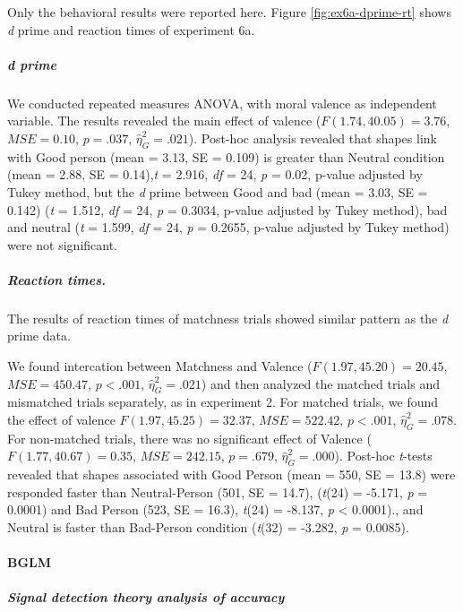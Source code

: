 \documentclass[
  english,
  man]{apa6}
\let\oldparagraph\paragraph
\renewcommand{\paragraph}[1]{\oldparagraph{#1}\mbox{}}
\let\oldsubparagraph\subparagraph
\renewcommand{\subparagraph}[1]{\oldsubparagraph{#1}\mbox{}}
\begin{document}
Only the behavioral results were reported here. Figure \ref{fig:ex6a-dprime-rt} shows \emph{d} prime and reaction times of experiment 6a.

\hypertarget{d-prime-3}{%
\subparagraph{d prime}\label{d-prime-3}}

We conducted repeated measures ANOVA, with moral valence as independent variable. The results revealed the main effect of valence (\(F(1.74, 40.05) = 3.76\), \(\mathit{MSE} = 0.10\), \(p = .037\), \(\hat{\eta}^2_G = .021\)). Post-hoc analysis revealed that shapes link with Good person (mean = 3.13, SE = 0.109) is greater than Neutral condition (mean = 2.88, SE = 0.14),\emph{t} = 2.916, \emph{df} = 24, \emph{p} = 0.02, p-value adjusted by Tukey method, but the \emph{d} prime between Good and bad (mean = 3.03, SE = 0.142) (\emph{t} = 1.512, \emph{df} = 24, \emph{p} = 0.3034, p-value adjusted by Tukey method), bad and neutral (\emph{t} = 1.599, \emph{df} = 24, \emph{p} = 0.2655, p-value adjusted by Tukey method) were not significant.

\hypertarget{reaction-times.}{%
\subparagraph{Reaction times.}\label{reaction-times.}}

The results of reaction times of matchness trials showed similar pattern as the \emph{d} prime data.

We found intercation between Matchness and Valence (\(F(1.97, 45.20) = 20.45\), \(\mathit{MSE} = 450.47\), \(p < .001\), \(\hat{\eta}^2_G = .021\)) and then analyzed the matched trials and mismatched trials separately, as in experiment 2. For matched trials, we found the effect of valence \(F(1.97, 45.25) = 32.37\), \(\mathit{MSE} = 522.42\), \(p < .001\), \(\hat{\eta}^2_G = .078\). For non-matched trials, there was no significant effect of Valence (\(F(1.77, 40.67) = 0.35\), \(\mathit{MSE} = 242.15\), \(p = .679\), \(\hat{\eta}^2_G = .000\)). Post-hoc \emph{t}-tests revealed that shapes associated with Good Person (mean = 550, SE = 13.8) were responded faster than Neutral-Person (501, SE = 14.7), (\emph{t}(24) = -5.171, \emph{p} = 0.0001) and Bad Person (523, SE = 16.3), \emph{t}(24) = -8.137, \emph{p} \textless{} 0.0001)., and Neutral is faster than Bad-Person condition (\emph{t}(32) = -3.282, \emph{p} = 0.0085).

\hypertarget{bglm-1}{%
\paragraph{BGLM}\label{bglm-1}}

\hypertarget{signal-detection-theory-analysis-of-accuracy-3}{%
\subparagraph{Signal detection theory analysis of accuracy}\label{signal-detection-theory-analysis-of-accuracy-3}}
\end{document}
